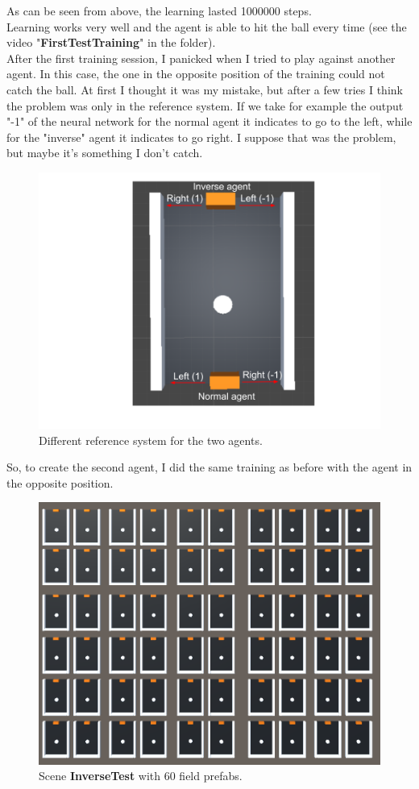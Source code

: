 \documentclass[12pt]{article}
\begin{document}
	\noindent	
	As can be seen from above, the learning lasted 1000000 steps. \\
	Learning works very well and the agent is able to hit the ball every time (see the video "\textbf{FirstTestTraining}" in the folder). \\
	After the first training session, I panicked when I tried to play against another agent. In this case, the one in the opposite position of the training could not catch the ball. At first I thought it was my mistake, but after a few tries I think the problem was only in the reference system. If we take for example the output "-1" of the neural network for the normal agent it indicates to go to the left, while for the "inverse" agent it indicates to go right. I suppose that was the problem, but maybe it's something I don't catch.
	
	\begin{figure}[hbt!]
		\centering
		\includegraphics[width= 1
		\textwidth]{images/AvsA.png}
		\caption{Different reference system for the two agents.}
	\end{figure}
	
	\noindent
	 So, to create the second agent, I did the same training as before with the agent in the opposite position.
	 \newpage
	
	\begin{figure}[hbt!]
		\centering
		\includegraphics[width= 0.76
		\textwidth]{images/InverseTraining1.png}
		\caption{Scene \textbf{InverseTest} with 60 field prefabs.}
	\end{figure}
	
\end{document}
